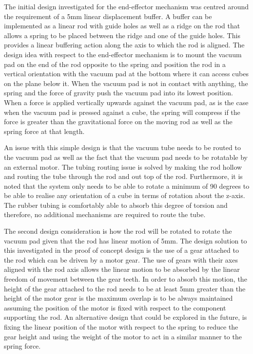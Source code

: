 The initial design investigated for the end-effector mechanism was centred around the requirement of a 5mm linear displacement buffer. A buffer can be implemented as a linear rod with guide holes as well as a ridge on the rod that allows a spring to be placed between the ridge and one of the guide holes. This provides a linear buffering action along the axis to which the rod is aligned. The design idea with respect to the end-effector mechanism is to mount the vacuum pad on the end of the rod opposite to the spring and position the rod in a vertical orientation with the vacuum pad at the bottom where it can access cubes on the plane below it. When the vacuum pad is not in contact with anything, the spring and the force of gravity push the vacuum pad into its lowest position. When a force is applied vertically upwards against the vacuum pad, as is the case when the vacuum pad is pressed against a cube, the spring will compress if the force is greater than the gravitational force on the moving rod as well as the spring force at that length.

An issue with this simple design is that the vacuum tube needs to be routed to the vacuum pad as well as the fact that the vacuum pad needs to be rotatable by an external motor. The tubing routing issue is solved by making the rod hollow and routing the tube through the rod and out top of the rod. Furthermore, it is noted that the system only needs to be able to rotate a minimum of 90 degrees to be able to realise any orientation of a cube in terms of rotation about the z-axis. The rubber tubing is comfortably able to absorb this degree of torsion and therefore, no additional mechanisms are required to route the tube.

The second design consideration is how the rod will be rotated to rotate the vacuum pad given that the rod has linear motion of 5mm. The design solution to this investigated in the proof of concept design is the use of a gear attached to the rod which can be driven by a motor gear. The use of gears with their axes aligned with the rod axis allows the linear motion to be absorbed by the linear freedom of movement between the gear teeth. In order to absorb this motion, the height of the gear attached to the rod needs to be at least 5mm greater than the height of the motor gear is the maximum overlap is to be always maintained assuming the position of the motor is fixed with respect to the component supporting the rod. An alternative design that could be explored in the future, is fixing the linear position of the motor with respect to the spring to reduce the gear height and using the weight of the motor to act in a similar manner to the spring force.

